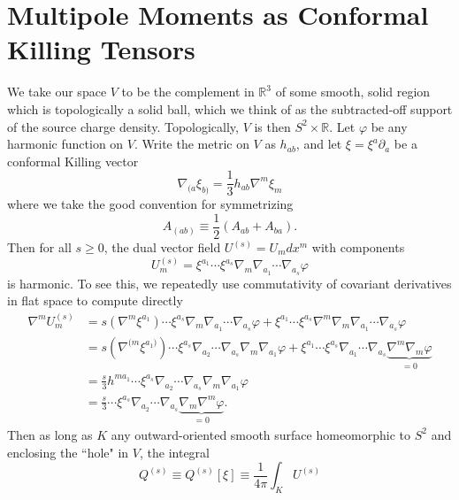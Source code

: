 \documentclass[11pt,letterpaper]{article}
\newcommand{\R}{\mathbb{R}}
\newcommand{\D}{\partial}
\begin{document}
\section{Multipole Moments as Conformal Killing Tensors}
We take our space $V$ to be the complement in $\R^3$ of some smooth, solid region which is topologically a solid ball, which we think of as the subtracted-off support of the source charge density. Topologically, $V$ is then $S^2 \times \R$. Let $\varphi$ be any harmonic function on $V$. Write the metric on $V$ as $h_{ab}$, and let $\xi = \xi^a \D_a$ be a conformal Killing vector \begin{equation}
\nabla_{(a} \xi_{b)} = \frac{1}{3} h_{ab} \nabla^m \xi_m
\end{equation}
where we take the good convention for symmetrizing \begin{equation}
A_{(ab)} \equiv \frac{1}{2} (A_{ab} + A_{ba}).
\end{equation}
Then for all $s \geq 0$, the dual vector field $U^{(s)} = U_m dx^m$ with components \begin{equation}
U^{(s)}_m = \xi^{a_1} \cdots \xi^{a_s} \nabla_m \nabla_{a_1} \cdots \nabla_{a_s} \varphi
\end{equation}
is harmonic. To see this, we repeatedly use commutativity of covariant derivatives in flat space to compute directly \begin{equation}
\begin{aligned}
\nabla^m U^{(s)}_m & = s (\nabla^m \xi^{a_1}) \cdots \xi^{a_s} \nabla_m \nabla_{a_1} \cdots \nabla_{a_s} \varphi + \xi^{a_1} \cdots \xi^{a_s} \nabla^m \nabla_m \nabla_{a_1} \cdots \nabla_{a_s} \varphi \\
& = s (\nabla^{(m} \xi^{a_1)}) \cdots \xi^{a_s} \nabla_{a_2} \cdots \nabla_{a_s} \nabla_m \nabla_{a_1} \varphi + \xi^{a_1} \cdots \xi^{a_s}  \nabla_{a_1} \cdots \nabla_{a_s} \underbrace{\nabla^m \nabla_m \varphi}_{=0} \\
& = \frac{s}{3} h^{ma_1} \cdots \xi^{a_s} \nabla_{a_2} \cdots \nabla_{a_s} \nabla_m \nabla_{a_1} \varphi \\
& = \frac{s}{3} \cdots \xi^{a_s} \nabla_{a_2} \cdots \nabla_{a_s} \underbrace{\nabla_m \nabla^m \varphi}_{=0}.
\end{aligned}
\end{equation}
Then as long as $K$ any outward-oriented smooth surface homeomorphic to $S^2$ and enclosing the ``hole" in $V$, the integral \begin{equation}
Q^{(s)} \equiv Q^{(s)}[\xi] \equiv \frac{1}{4 \pi} \int_K U^{(s)}
\end{equation}
\end{document}
